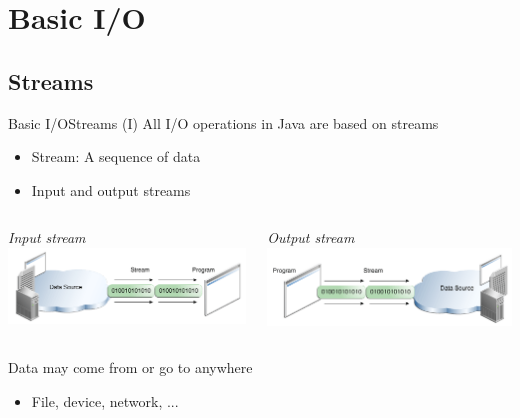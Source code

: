 \documentclass[10pt,compress]{beamer} %
\begin{document}
\section{Basic I/O}
\subsection{Streams}
\begin{frame}{Basic I/O}{Streams (I)}
	All I/O operations in Java are based on \alert{streams}
		\begin{itemize}
			\item Stream: A sequence of data
			\item Input and output streams
		\end{itemize}

    \begin{columns}
		\centering \textit{Input stream}
		\vspace{-0.2cm}
		\includegraphics[width=\linewidth]{figs/io-ins.png}

		\centering \textit{Output stream}
		\vspace{-0.2cm}
		\includegraphics[width=\linewidth]{figs/io-outs.png}
	\end{columns}

    \bigskip
	Data may come from or go to anywhere
		\begin{itemize}
			\item File, device, network, ...
		\end{itemize}


\end{frame}
\end{document}
